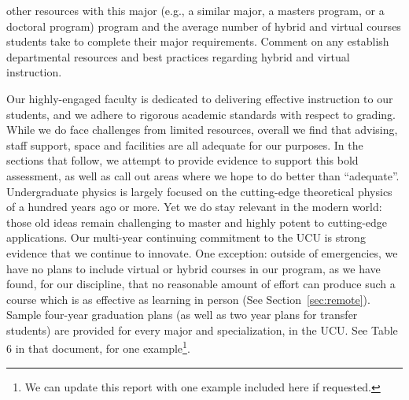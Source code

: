 \documentclass[12pt]{article}
\begin{document}
other resources with this major (e.g., a similar major, a masters program, or a doctoral 
program)
program and the average number of hybrid and virtual courses students take to complete their 
major requirements. Comment on any establish departmental resources and best practices 
regarding hybrid and virtual instruction.

\noindent
Our highly-engaged faculty is dedicated to delivering effective
instruction to our students, and we adhere to rigorous academic
standards with respect to grading.  While we do face challenges from
limited resources, overall we find that advising, staff support, space
and facilities are all adequate for our purposes.  In the sections
that follow, we attempt to provide evidence to support this bold
assessment, as well as call out areas where we hope to do better than
``adequate''.  Undergraduate physics is largely focused on the
cutting-edge theoretical physics of a hundred years ago or more.  Yet
we do stay relevant in the modern world: those old ideas remain
challenging to master and highly potent to cutting-edge applications.
Our multi-year continuing commitment to the UCU is strong evidence
that we continue to innovate.  One exception: outside of emergencies,
we have no plans to include virtual or hybrid courses in our program,
as we have found, for our discipline, that no reasonable amount of
effort can produce such a course which is as effective as learning in
person (See Section~\ref{sec:remote}).  Sample four-year graduation
plans (as well as two year plans for transfer students) are provided
for every major and specialization, in the UCU.  See Table 6 in that
document, for one example\footnote{We can update this report with one
  example included here if requested.}.\\[3pt]
\end{document}
